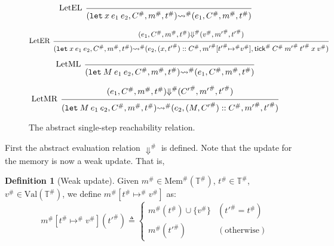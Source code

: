 \documentclass[acmsmall,screen,review]{acmart}
\theoremstyle{definition}
\newtheorem{definition}{Definition}[section]
\newcommand*{\cons}{::}
\newcommand*{\A}[1]{{#1}^{\#}}
\newcommand*{\Time}{\mathbb{T}}
\newcommand*{\ATime}{\A{\Time}}
\newcommand*{\Value}[1]{\text{Val}({#1})}
\newcommand*{\mem}{m}
\newcommand*{\AMem}[1]{\A{\text{Mem}}({#1})}
\newcommand*{\tick}{\mathsf{tick}}
\begin{document}
\begin{figure}[htb]
  \[
    \begin{prooftree}
      \infer[left label=LetEL]0{
      (\mathtt{let}\:x\:e_1\:e_2, \A{C}, \A{\mem}, \A{t})
      \A\rightsquigarrow
      (e_{1}, \A{C}, \A{\mem}, \A{t})
      }
    \end{prooftree}
  \]

  \[
    \begin{prooftree}
      \hypo{
        \begin{matrix}
          (e_{1}, \A{C}, \A{\mem}, \A{t})
          \A\Downarrow
          (\A{v}, \A{\mem'}, \A{t'})
        \end{matrix}
      }
      \infer[left label=LetER]1{
      (\mathtt{let}\:x\:e_1\:e_2, \A{C}, \A{\mem}, \A{t})
      \A\rightsquigarrow
      (e_{2}, (x, \A{t'})\cons\A{C}, \A{\mem'}[\A{t'}\A{\mapsto} \A{v}], \A{\tick}\:\A{C}\:\A{\mem'}\:\A{t'}\:x\:\A{v})
      }
    \end{prooftree}
  \]

  \[
    \begin{prooftree}
      \infer[left label=LetML]0{
      (\mathtt{let}\:M\:e_{1}\:e_{2}, \A{C}, \A{\mem}, \A{t})
      \A\rightsquigarrow
      (e_{1}, \A{C}, \A{\mem}, \A{t})
      }
    \end{prooftree}
  \]

  \[
    \begin{prooftree}
      \hypo{
        \begin{matrix}
          (e_{1}, \A{C}, \A{\mem}, \A{t})
          \A\Downarrow
          (\A{C'}, \A{\mem'}, \A{t'})
        \end{matrix}
      }
      \infer[left label=LetMR]1{
      (\mathtt{let}\:M\:e_{1}\:e_{2}, \A{C}, \A{\mem}, \A{t})
      \A\rightsquigarrow
      (e_{2}, (M,\A{C'})\cons\A{C}, \A{\mem'}, \A{t'})
      }
    \end{prooftree}
  \]
  \caption{The abstract single-step reachability relation.}
  \label{fig:absreach}
\end{figure}

First the abstract evaluation relation $\A{\Downarrow}$ is defined.
Note that the update for the memory is now a weak update. That is,
\begin{definition}[Weak update]
  Given $\A{\mem}\in\AMem{\ATime}$, $\A{t}\in\ATime$, $\A{v}\in\Value{\ATime}$, we define $\A{\mem}[\A{t}\A{\mapsto}\A{v}]$ as:
  \[
    \A{\mem}[\A{t}\A{\mapsto}\A{v}](\A{t'})\triangleq
    \begin{cases}
      \A{\mem}(\A{t})\cup\{\A{v}\} & (\A{t'}=\A{t})     \\
      \A{\mem}(\A{t'})             & (\text{otherwise})
    \end{cases}
  \]
\end{definition}
\end{document}
